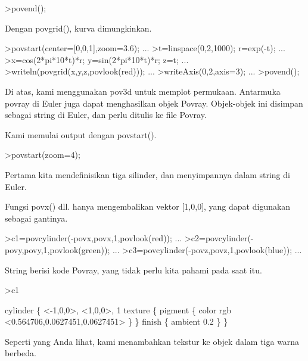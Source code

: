 \documentclass[a4paper,10pt]{article}
\begin{document}
\begin{eulernotebook}
\begin{eulercomment}
\begin{eulercomment}
\begin{eulerprompt}
>povend();
\end{eulerprompt}
\begin{eulercomment}
Dengan povgrid(), kurva dimungkinkan.
\end{eulercomment}
\begin{eulerprompt}
>povstart(center=[0,0,1],zoom=3.6); ...
>t=linspace(0,2,1000); r=exp(-t); ...
>x=cos(2*pi*10*t)*r; y=sin(2*pi*10*t)*r; z=t; ...
>writeln(povgrid(x,y,z,povlook(red))); ...
>writeAxis(0,2,axis=3); ...
>povend();
\end{eulerprompt}
\begin{eulercomment}
Di atas, kami menggunakan pov3d untuk memplot permukaan. Antarmuka
povray di Euler juga dapat menghasilkan objek Povray. Objek-objek ini
disimpan sebagai string di Euler, dan perlu ditulis ke file Povray.

Kami memulai output dengan povstart().
\end{eulercomment}
\begin{eulerprompt}
>povstart(zoom=4);
\end{eulerprompt}
\begin{eulercomment}
Pertama kita mendefinisikan tiga silinder, dan menyimpannya dalam
string di Euler.

Fungsi povx() dll. hanya mengembalikan vektor [1,0,0], yang dapat
digunakan sebagai gantinya.
\end{eulercomment}
\begin{eulerprompt}
>c1=povcylinder(-povx,povx,1,povlook(red)); ...
>c2=povcylinder(-povy,povy,1,povlook(green)); ...
>c3=povcylinder(-povz,povz,1,povlook(blue)); ...
\end{eulerprompt}
\begin{eulercomment}
String berisi kode Povray, yang tidak perlu kita pahami pada saat itu.
\end{eulercomment}
\begin{eulerprompt}
>c1
\end{eulerprompt}
\begin{euleroutput}
  cylinder \{ <-1,0,0>, <1,0,0>, 1
   texture \{ pigment \{ color rgb <0.564706,0.0627451,0.0627451> \}  \} 
   finish \{ ambient 0.2 \} 
   \}
\end{euleroutput}
\begin{eulercomment}
Seperti yang Anda lihat, kami menambahkan tekstur ke objek dalam tiga
warna berbeda.


\end{eulercomment}
\end{eulercomment}
\end{eulercomment}
\end{eulernotebook}
\end{document}
